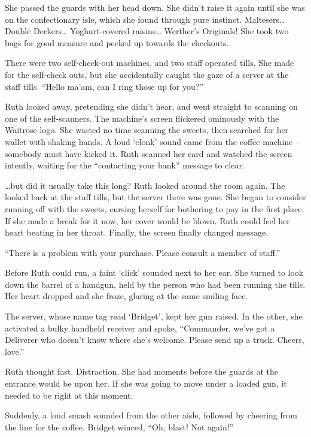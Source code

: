 She passed the guards with her head down. She didn’t raise it again until she was on the confectionary isle, which she found through pure instinct. Maltesers… Double Deckers… Yoghurt-covered raisins… Werther's Originals! She took two bags for good measure and peeked up towards the checkouts. 

There were two self-check-out machines, and two staff operated tills. She made for the self-check outs, but she accidentally caught the gaze of a server at the staff tills. “Hello ma’am, can I ring those up for you?” 

Ruth looked away, pretending she didn’t hear, and went straight to scanning on one of the self-scanners. The machine’s screen flickered ominously with the Waitrose logo. She wasted no time scanning the sweets, then searched for her wallet with shaking hands. A loud ‘clonk’ sound came from the coffee machine – somebody must have kicked it. Ruth scanned her card and watched the screen intently, waiting for the “contacting your bank” message to clear. 

…but did it usually take this long? Ruth looked around the room again. The looked back at the staff tills, but the server there was gone. She began to consider running off with the sweets, cursing herself for bothering to pay in the first place. If she made a break for it now, her cover would be blown. Ruth could feel her heart beating in her throat. Finally, the screen finally changed message. 

“There is a problem with your purchase. Please consult a member of staff.”

Before Ruth could run, a faint ‘click’ sounded next to her ear. She turned to look down the barrel of a handgun, held by the person who had been running the tills. Her heart dropped and she froze, glaring at the same smiling face. 

The server, whose name tag read ‘Bridget’, kept her gun raised. In the other, she activated a bulky handheld receiver and spoke, “Commander, we’ve got a Deliverer who doesn’t know where she’s welcome. Please send up a truck. Cheers, love.”

Ruth thought fast. Distraction. She had moments before the guards at the entrance would be upon her. If she was going to move under a loaded gun, it needed to be right at this moment. 

Suddenly, a loud smash sounded from the other aisle, followed by cheering from the line for the coffee. Bridget winced, “Oh, blast! Not again!”

